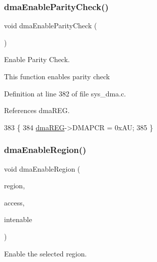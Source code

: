 \subsubsection{\texorpdfstring{dma\+Enable\+Parity\+Check()}{dmaEnableParityCheck()}}
{\footnotesize\ttfamily void dma\+Enable\+Parity\+Check (\begin{DoxyParamCaption}\item[{void}]{ }\end{DoxyParamCaption})}



Enable Parity Check. 

This function enables parity check 

Definition at line 382 of file sys\+\_\+dma.\+c.



References dma\+R\+EG.


\begin{DoxyCode}
383 \{
384     \mbox{\hyperlink{reg__dma_8h_aae27308852f460efc99fcbf6eb47ea86}{dmaREG}}->DMAPCR = 0xAU;
385 \}
\end{DoxyCode}
\mbox{\label{group__DMA_gac3b7143e56e44b8e34ec350878e5f6df}} 
\subsubsection{\texorpdfstring{dma\+Enable\+Region()}{dmaEnableRegion()}}
{\footnotesize\ttfamily void dma\+Enable\+Region (\begin{DoxyParamCaption}\item[{dma\+R\+E\+G\+I\+O\+N\+\_\+t}]{region,  }\item[{dma\+Region\+Access\+\_\+t}]{access,  }\item[{boolean}]{intenable }\end{DoxyParamCaption})}



Enable the selected region. 


